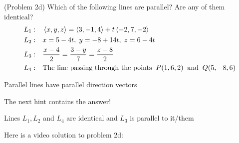 \documentclass[handout]{ximera}
\begin{document}
\begin{problem}(Problem 2d)
Which of the following lines are parallel? Are any of them identical?
\begin{align*}
L_1:&\quad \left\langle x, y, z\right\rangle = \left\langle 3,-1,4\right\rangle + t\left\langle -2,7,-2\right\rangle\\
L_2:& \quad x = 5-4t,\; y = -8+ 14t,\; z = 6-4t\\
L_3:& \quad \frac{x - 4 }{2} = \frac{3 -y}{7}= \frac{z - 8}{2}\\
L_4:&\quad  \text{The line passing through the points} \;\; P(1, 6, 2)\;\; \text{and} \;\; Q(5, -8, 6)
\end{align*}
\begin{hint}
Parallel lines have parallel direction vectors
\end{hint}
\begin{hint}
The next hint contains the answer!
\end{hint}
\begin{hint}
Lines $L_1, L_2$ and $L_4$ are identical and $L_3$ is parallel to it/them
\end{hint}
\end{problem}

Here is a video solution to problem 2d:\\
\begin{foldable}
\end{foldable}
\end{document}
